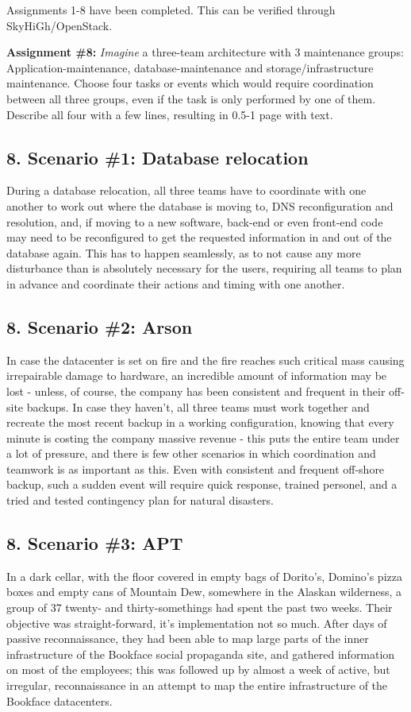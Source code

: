 Assignments 1-8 have been completed. This can be verified through SkyHiGh/OpenStack.

\textbf{Assignment \#8:} \textit{Imagine} a three-team architecture with 3 maintenance groups: Application-maintenance, database-maintenance and storage/infrastructure maintenance. Choose four tasks or events which would require coordination between all three groups, even if the task is only performed by one of them. Describe all four with a few lines, resulting in 0.5-1 page with text.

\subsection{8. Scenario \#1: Database relocation}
During a database relocation, all three teams have to coordinate with one another to work out where the database is moving to, DNS reconfiguration and resolution, and, if moving to a new software, back-end or even front-end code may need to be reconfigured to get the requested information in and out of the database again. This has to happen seamlessly, as to not cause any more disturbance than is absolutely necessary for the users, requiring all teams to plan in advance and coordinate their actions and timing with one another.

\subsection{8. Scenario \#2: Arson}
In case the datacenter is set on fire and the fire reaches such critical mass causing irrepairable damage to hardware, an incredible amount of information may be lost - unless, of course, the company has been consistent and frequent in their off-site backups. In case they haven't, all three teams must work together and recreate the most recent backup in a working configuration, knowing that every minute is costing the company massive revenue - this puts the entire team under a lot of pressure, and there is few other scenarios in which coordination and teamwork is as important as this. Even with consistent and frequent off-shore backup, such a sudden event will require quick response, trained personel, and a tried and tested contingency plan for natural disasters.

\subsection{8. Scenario \#3: APT}
In a dark cellar, with the floor covered in empty bags of Dorito's, Domino's pizza boxes and empty cans of Mountain Dew, somewhere in the Alaskan wilderness, a group of 37 twenty- and thirty-somethings had spent the past two weeks. Their objective was straight-forward, it's implementation not so much. After days of passive reconnaissance, they had been able to map large parts of the inner infrastructure of the Bookface social propaganda site, and gathered information on most of the employees; this was followed up by almost a week of active, but irregular, reconnaissance in an attempt to map the entire infrastructure of the Bookface datacenters. 

